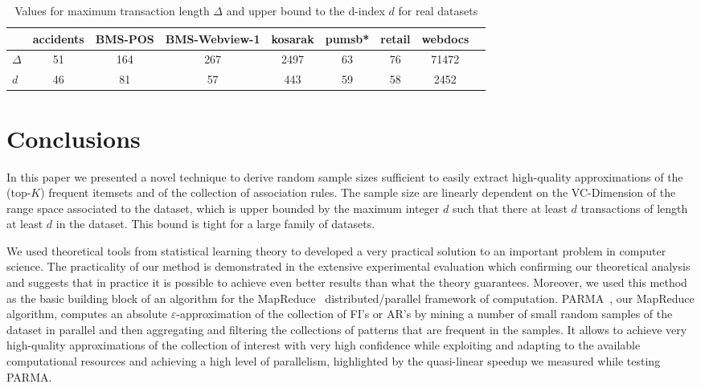\begin{table}[hbt]
\centering
\caption{Values for maximum transaction length $\Delta$ and upper bound to the
d-index $d$ for real datasets}
\label{tab:deltadrealds}

\begin{tabular}{lcccccccc}
  \toprule
  & accidents & BMS-POS & BMS-Webview-1 & kosarak & pumsb* & retail & webdocs \\
  \midrule
  $\Delta$ & 51 & 164 & 267 & 2497 & 63 & 76 & 71472 \\
  $d$ & 46 & 81 & 57 & 443 & 59 & 58 & 2452 \\ 
  \bottomrule
\end{tabular}
\end{table}

\section{Conclusions}\label{sec:vcmineconcl}
In this paper we presented a novel technique to derive random sample sizes
sufficient to easily extract high-quality approximations of the (top-$K$)
frequent itemsets and of the collection of association rules. The sample size
are linearly dependent on the VC-Dimension of the range space associated to the
dataset, which is upper bounded by the maximum integer $d$ such
that there at least $d$ transactions of length at least $d$ in the dataset. This 
bound is tight for a large family of datasets.  

We used theoretical tools from statistical learning theory to developed a very
practical solution to an important problem in computer science. The practicality
of our method is demonstrated in the extensive experimental evaluation which
confirming our theoretical analysis and suggests that in practice it is possible
to achieve even better results than what the theory guarantees. Moreover, we
used this method as the basic building block of an algorithm for the
MapReduce~\citep{DeanS04} distributed/parallel framework of computation.
PARMA~\citep{RiondatoDFU12}, our MapReduce algorithm, computes an absolute
$\varepsilon$-approximation of the collection of FI's or AR's by mining a number
of small random samples of the dataset in parallel and then aggregating and
filtering the collections of patterns that are frequent in the samples. It
allows to achieve very high-quality approximations of the collection of interest
with very high confidence while exploiting and adapting to the available
computational resources and achieving a high level of parallelism, highlighted 
by the quasi-linear speedup we measured while testing PARMA.

